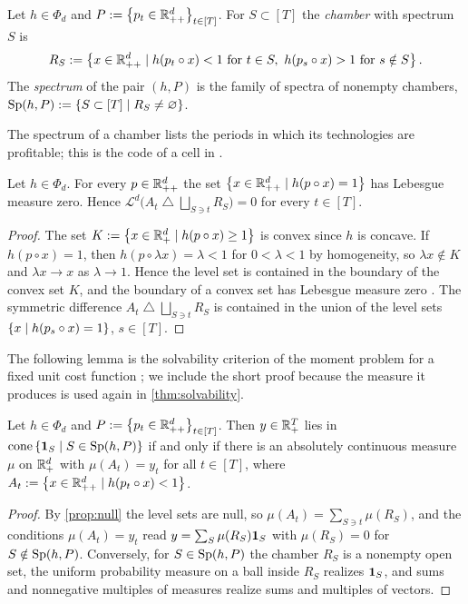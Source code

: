 \begin{definition}[spectrum]\label{def:spectrum}
Let $h\in\Phi_d$ and $P:=\set{p_t\in\Rpp[d]}_{t\in[T]}$. For $S\subset[T]$ the \emph{chamber} with spectrum $S$ is
\[
R_S:=\set{x\in\Rpp[d]\mid h(p_t\circ x)<1\text{ for }t\in S,\ h(p_s\circ x)>1\text{ for }s\notin S}.
\]
The \emph{spectrum} of the pair $(h,P)$ is the family of spectra of nonempty chambers, $\Sp(h,P):=\set{S\subset[T]\mid R_S\ne\varnothing}$.
\end{definition}

The spectrum of a chamber lists the periods in which its technologies are profitable; this is the code of a cell in \citet{Shananin1999}.

\begin{proposition}\label{prop:null}
Let $h\in\Phi_d$. For every $p\in\Rpp[d]$ the set $\set{x\in\Rpp[d]\mid h(p\circ x)=1}$ has Lebesgue measure zero. Hence $\mathcal L^d\bigl(A_t\mathbin{\triangle}\bigsqcup_{S\ni t}R_S\bigr)=0$ for every $t\in[T]$.
\end{proposition}

\begin{proof}
The set $K:=\set{x\in\Rp[d]\mid h(p\circ x)\ge1}$ is convex since $h$ is concave. If $h(p\circ x)=1$, then $h(p\circ\lambda x)=\lambda<1$ for $0<\lambda<1$ by homogeneity, so $\lambda x\notin K$ and $\lambda x\to x$ as $\lambda\to1$. Hence the level set is contained in the boundary of the convex set $K$, and the boundary of a convex set has Lebesgue measure zero \citep{Lang1986}. The symmetric difference $A_t\mathbin{\triangle}\bigsqcup_{S\ni t}R_S$ is contained in the union of the level sets $\set{x\mid h(p_s\circ x)=1}$, $s\in[T]$.
\end{proof}

The following lemma is the solvability criterion of the moment problem for a fixed unit cost function \citep[Prop.~3.1]{Shananin1999}; we include the short proof because the measure it produces is used again in \cref{thm:solvability}.

\begin{lemma}[signature]\label{lem:signature}
Let $h\in\Phi_d$ and $P:=\set{p_t\in\Rpp[d]}_{t\in[T]}$. Then $y\in\Rp[T]$ lies in $\cone\set{\ind S\mid S\in\Sp(h,P)}$ if and only if there is an absolutely continuous measure $\mu$ on $\Rp[d]$ with $\mu(A_t)=y_t$ for all $t\in[T]$, where $A_t:=\set{x\in\Rpp[d]\mid h(p_t\circ x)<1}$.
\end{lemma}

\begin{proof}
By \cref{prop:null} the level sets are null, so $\mu(A_t)=\sum_{S\ni t}\mu(R_S)$, and the conditions $\mu(A_t)=y_t$ read $y=\sum_S\mu(R_S)\ind S$ with $\mu(R_S)=0$ for $S\notin\Sp(h,P)$. Conversely, for $S\in\Sp(h,P)$ the chamber $R_S$ is a nonempty open set, the uniform probability measure on a ball inside $R_S$ realizes $\ind S$, and sums and nonnegative multiples of measures realize sums and multiples of vectors.
\end{proof}


